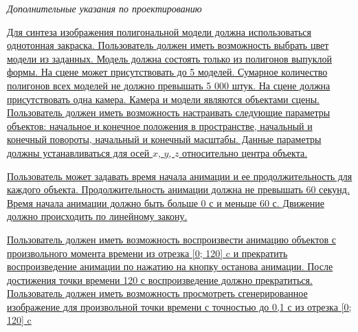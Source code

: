 
\clearpage
{}
\thispagestyle{empty}

\begin{center}
    \fontsize{12pt}{\baselineskip}\selectfont
    \textit{Дополнительные указания по проектированию}
\end{center}

\begingroup
\fontsize{12pt}{0.7\baselineskip}\selectfont
\setlength{\parskip}{0em}
\setlength{\parindent}{0em}

\uline{\mbox{\hspace*{1.25cm}} Для синтеза изображения полигональной модели должна использоваться однотонная закраска. Пользователь должен иметь возможность выбрать цвет модели из заданных. Модель должна состоять только из полигонов выпуклой формы. На сцене может присутствовать до 5 моделей. Сумарное количество полигонов всех моделей не должно превышать 5 000 штук. На сцене должна присутствовать одна камера. Камера и модели являются объектами сцены. Пользователь должен иметь возможность настраивать следующие параметры объектов: начальное и конечное положения в пространстве, начальный и конечный повороты, начальный и конечный масштабы. Данные параметры должны устанавливаться для осей $x$, $y$, $z$ относительно центра объекта.
    \hfill
}


\uline{\mbox{\hspace*{1.25cm}} Пользователь может задавать время начала анимации и ее продолжительность для каждого объекта. Продолжительность анимации должна не превышать 60 секунд. Время начала анимации должно быть больше 0 с и меньше 60 с. Движение должно происходить по линейному закону.\hfill}


\uline{\mbox{\hspace*{1.25cm}} Пользователь должен иметь возможность воспроизвести анимацию объектов с произвольного момента времени из отрезка [0; 120] c  и прекратить воспроизведение анимации по нажатию на кнопку останова анимации. После достижения точки времени 120 с воспроизведение должно прекратиться. Пользователь должен иметь возможность просмотреть сгенерированное изображение для произвольной точки времени с точностью до 0,1 с из отрезка [0; 120] c \hfill}


\endgroup
\normalsize
\restoregeometry
